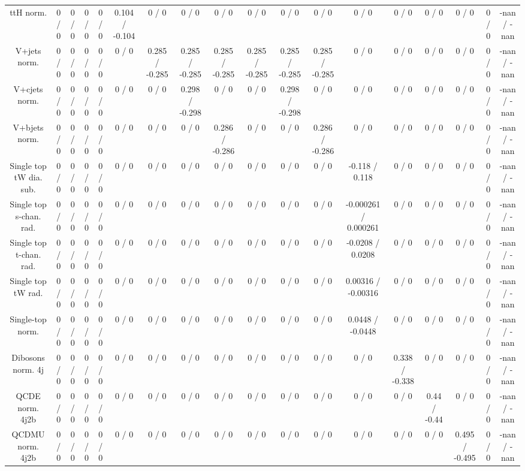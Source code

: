 \documentclass[10pt]{article}
\begin{document}
\begin{table}[htbp]
\begin{center}
\begin{tabular}{|c|c|c|c|c|c|c|c|c|c|c|c|c|c|c|c|c|c|}
  ttH norm. & 0 / 0 & 0 / 0 & 0 / 0 & 0 / 0 & 0.104 / -0.104 & 0 / 0 & 0 / 0 & 0 / 0 & 0 / 0 & 0 / 0 & 0 / 0 & 0 / 0 & 0 / 0 & 0 / 0 & 0 / 0 & 0 / 0 & -nan / -nan \\ 
  V+jets norm. & 0 / 0 & 0 / 0 & 0 / 0 & 0 / 0 & 0 / 0 & 0.285 / -0.285 & 0.285 / -0.285 & 0.285 / -0.285 & 0.285 / -0.285 & 0.285 / -0.285 & 0.285 / -0.285 & 0 / 0 & 0 / 0 & 0 / 0 & 0 / 0 & 0 / 0 & -nan / -nan \\ 
  V+cjets norm. & 0 / 0 & 0 / 0 & 0 / 0 & 0 / 0 & 0 / 0 & 0 / 0 & 0.298 / -0.298 & 0 / 0 & 0 / 0 & 0.298 / -0.298 & 0 / 0 & 0 / 0 & 0 / 0 & 0 / 0 & 0 / 0 & 0 / 0 & -nan / -nan \\ 
  V+bjets norm. & 0 / 0 & 0 / 0 & 0 / 0 & 0 / 0 & 0 / 0 & 0 / 0 & 0 / 0 & 0.286 / -0.286 & 0 / 0 & 0 / 0 & 0.286 / -0.286 & 0 / 0 & 0 / 0 & 0 / 0 & 0 / 0 & 0 / 0 & -nan / -nan \\ 
  Single top tW dia. sub. & 0 / 0 & 0 / 0 & 0 / 0 & 0 / 0 & 0 / 0 & 0 / 0 & 0 / 0 & 0 / 0 & 0 / 0 & 0 / 0 & 0 / 0 & -0.118 / 0.118 & 0 / 0 & 0 / 0 & 0 / 0 & 0 / 0 & -nan / -nan \\ 
  Single top s-chan. rad. & 0 / 0 & 0 / 0 & 0 / 0 & 0 / 0 & 0 / 0 & 0 / 0 & 0 / 0 & 0 / 0 & 0 / 0 & 0 / 0 & 0 / 0 & -0.000261 / 0.000261 & 0 / 0 & 0 / 0 & 0 / 0 & 0 / 0 & -nan / -nan \\ 
  Single top t-chan. rad. & 0 / 0 & 0 / 0 & 0 / 0 & 0 / 0 & 0 / 0 & 0 / 0 & 0 / 0 & 0 / 0 & 0 / 0 & 0 / 0 & 0 / 0 & -0.0208 / 0.0208 & 0 / 0 & 0 / 0 & 0 / 0 & 0 / 0 & -nan / -nan \\ 
  Single top tW rad. & 0 / 0 & 0 / 0 & 0 / 0 & 0 / 0 & 0 / 0 & 0 / 0 & 0 / 0 & 0 / 0 & 0 / 0 & 0 / 0 & 0 / 0 & 0.00316 / -0.00316 & 0 / 0 & 0 / 0 & 0 / 0 & 0 / 0 & -nan / -nan \\ 
  Single-top norm. & 0 / 0 & 0 / 0 & 0 / 0 & 0 / 0 & 0 / 0 & 0 / 0 & 0 / 0 & 0 / 0 & 0 / 0 & 0 / 0 & 0 / 0 & 0.0448 / -0.0448 & 0 / 0 & 0 / 0 & 0 / 0 & 0 / 0 & -nan / -nan \\ 
  Dibosons norm. 4j & 0 / 0 & 0 / 0 & 0 / 0 & 0 / 0 & 0 / 0 & 0 / 0 & 0 / 0 & 0 / 0 & 0 / 0 & 0 / 0 & 0 / 0 & 0 / 0 & 0.338 / -0.338 & 0 / 0 & 0 / 0 & 0 / 0 & -nan / -nan \\ 
  QCDE norm. 4j2b & 0 / 0 & 0 / 0 & 0 / 0 & 0 / 0 & 0 / 0 & 0 / 0 & 0 / 0 & 0 / 0 & 0 / 0 & 0 / 0 & 0 / 0 & 0 / 0 & 0 / 0 & 0.44 / -0.44 & 0 / 0 & 0 / 0 & -nan / -nan \\ 
  QCDMU norm. 4j2b & 0 / 0 & 0 / 0 & 0 / 0 & 0 / 0 & 0 / 0 & 0 / 0 & 0 / 0 & 0 / 0 & 0 / 0 & 0 / 0 & 0 / 0 & 0 / 0 & 0 / 0 & 0 / 0 & 0.495 / -0.495 & 0 / 0 & -nan / -nan \\ 

\end{tabular}
\end{center}
\end{table}
\end{document}
